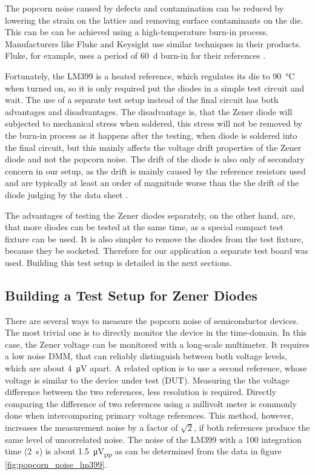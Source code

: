 The popcorn noise caused by defects and contamination can be reduced by lowering the strain on the lattice and removing surface contaminants on the die. This can be can be achieved using a high-temperature burn-in process. Manufacturers like Fluke and Keysight use similar techniques in their products. Fluke, for example, uses a period of \qty{60}{\day} burn-in for their references \cite{zener_popcorn_noise}.

Fortunately, the LM399 is a heated reference, which regulates its die to \qty{90}{\celsius} when turned on, so it is only required put the diodes in a simple test circuit and wait. The use of a separate test setup instead of the final circuit has both advantages and disadvantages. The disadvantage is, that the Zener diode will subjected to mechanical stress when soldered, this stress will not be removed by the burn-in process as it happens after the testing, when diode is soldered into the final circuit, but this mainly affects the voltage drift properties of the Zener diode and not the popcorn noise. The drift of the diode is also only of secondary concern in our setup, as the drift is mainly caused by the reference resistors used and are typically at least an order of magnitude worse than the the drift of the diode judging by the data sheet \cite{datasheet_LM399,datasheet_VPR}.

The advantages of testing the Zener diodes separately, on the other hand, are, that more diodes can be tested at the same time, as a special compact test fixture can be used. It is also simpler to remove the diodes from the test fixture, because they be socketed. Therefore for our application a separate test board was used. Building this test setup is detailed in the next sections.

\subsection{Building a Test Setup for Zener Diodes}
There are several ways to measure the popcorn noise of semiconductor devices. The most trivial one is to directly monitor the device in the time-domain. In this case, the Zener voltage can be monitored with a long-scale multimeter. It requires a low noise DMM, that can reliably distinguish between both voltage levels, which are about \qty{4}{\micro \volt} apart.
A related option is to use a second reference, whose voltage is similar to the device under test (DUT). Measuring the the voltage difference between the two references, less resolution is required. Directly comparing the difference of two references using a millivolt meter is commonly done when intercomparing primary voltage references. This method, however, increases the measurement noise by a factor of $\sqrt{2}$, if both references produce the same level of uncorrelated noise. The noise of the LM399 with a \qty{100}{\plc} integration time (\qty{2}{\second}) is about \qty{1.5}{\micro \volt_{pp}} as can be determined from the data in figure \ref{fig:popcorn_noise_lm399}.

